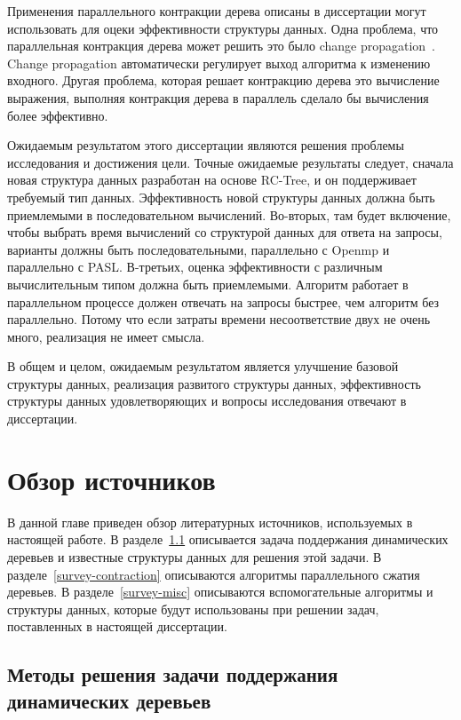 \documentclass[specification,annotation,times]{itmo-student-thesis}
\newcommand{\revise}[1]{{\color{red!70!black} #1 }}
\begin{document}
\revise{
Применения параллельного контракции дерева описаны в диссертации могут  использовать для оцеки эффективности 
структуры данных. Одна проблема, что параллельная контракция дерева может решить это было change propagation~\cite{acar05}.
Change propagation автоматически регулирует выход алгоритма к изменению входного. Другая 
проблема, которая решает контракцию дерева это вычисление выражения, выполняя контракция дерева в параллель 
сделало бы вычисления более эффективно.

Ожидаемым результатом этого диссертации являются решения проблемы исследования и достижения цели. Точные 
ожидаемые результаты следует, сначала новая структура данных разработан на основе RC-Tree, и он поддерживает 
требуемый тип данных. Эффективность новой структуры данных должна быть приемлемыми в последовательном 
вычислений. Во-вторых, там будет включение, чтобы выбрать время вычислений со структурой данных для ответа на 
запросы, варианты должны быть последовательными, параллельно с Openmp и параллельно с PASL. В-третьих, оценка 
эффективности с различным вычислительным типом должна быть приемлемыми. Алгоритм работает в параллельном 
процессе должен отвечать на запросы быстрее, чем алгоритм без параллельно. Потому что если затраты времени 
несоответствие двух не очень много, реализация не имеет смысла.

В общем и целом, ожидаемым результатом является улучшение базовой структуры данных, реализация развитого 
структуры данных, эффективность структуры данных удовлетворяющих и вопросы исследования отвечают в 
диссертации.
}

\chapter{Обзор источников}

В данной главе приведен обзор литературных источников, используемых в настоящей работе. 
В разделе~\ref{survey-tree} описывается задача поддержания динамических деревьев и известные структуры данных для решения этой задачи.
В разделе~\ref{survey-contraction} описываются алгоритмы параллельного сжатия деревьев.
В разделе~\ref{survey-misc} описываются вспомогательные алгоритмы и структуры данных, которые будут использованы при решении задач, поставленных в настоящей диссертации.

\section{Методы решения задачи поддержания динамических деревьев}\label{survey-tree}
\end{document}
